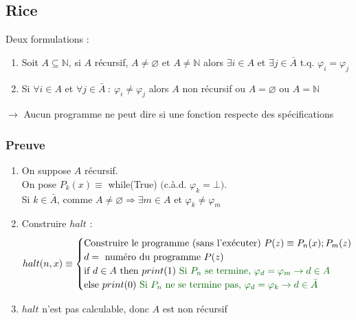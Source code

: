 \subsection{Rice}\label{dem:Rice}

Deux formulations :
\begin{enumerate}
\item Soit $A \subseteq \mathbb{N}$, si $A$ récursif, $A \neq \varnothing$ et $A \neq \mathbb{N}$ alors $\exists i \in A$ et $\exists j \in \bar{A}$ t.q. $\varphi_i = \varphi_j$
\item Si $\forall i \in A$ et $\forall j \in \bar{A} \ : \ \varphi_i \neq \varphi_j$ alors $A$ non récursif ou $A = \varnothing$ ou $A = \mathbb{N}$
\end{enumerate}
$\rightarrow$ Aucun programme ne peut dire si une fonction respecte des spécifications


\subsubsection{Preuve}

\begin{enumerate}
\item On suppose $A$ récursif.\\
	On pose $P_k(x) \equiv$ while(True) $($c.à.d. $\varphi_k = \bot)$.\\
	Si $k \in \bar{A}$, comme $A \neq \varnothing \Rightarrow \exists m \in A$ et $\varphi_k \neq \varphi_m$
\item Construire $halt$ :
	\begin{equation*}
		 halt(n,x) \equiv
		 \begin{cases}
		 \text{Construire le programme (sans l'exécuter) } P(z) \equiv P_n(x); P_m(z)\\
		 d = \text{ numéro du programme }P(z)\\
		 \text{if } d \in A \text{ then } print(1) \ \green{\text{Si }P_n \text{ se termine, } \varphi_d = \varphi_m \rightarrow d \in A}\\
		 \text{else } print(0) \ \green{\text{Si }P_n \text{ ne se termine pas, } \varphi_d = \varphi_k \rightarrow d \in \bar{A}}\\
		 \end{cases}
	\end{equation*}
\item $halt$ n'est pas calculable, donc $A$ est non récursif
\end{enumerate}

